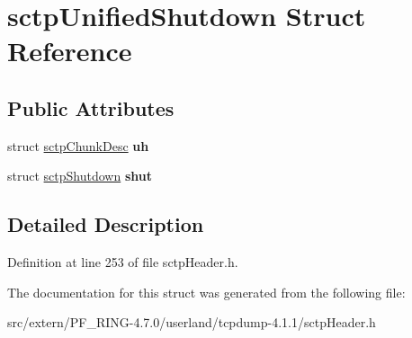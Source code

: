 \hypertarget{structsctp_unified_shutdown}{
\section{sctpUnifiedShutdown Struct Reference}
\label{structsctp_unified_shutdown}
}
\subsection*{Public Attributes}
\begin{DoxyCompactItemize}
\item 
\hypertarget{structsctp_unified_shutdown_a99b7668a0f0a5b8d8cde5ee662668435}{
struct \hyperlink{structsctp_chunk_desc}{sctpChunkDesc} {\bfseries uh}}
\label{structsctp_unified_shutdown_a99b7668a0f0a5b8d8cde5ee662668435}

\item 
\hypertarget{structsctp_unified_shutdown_a76419d944b06e6db6559a7b240d8636c}{
struct \hyperlink{structsctp_shutdown}{sctpShutdown} {\bfseries shut}}
\label{structsctp_unified_shutdown_a76419d944b06e6db6559a7b240d8636c}

\end{DoxyCompactItemize}


\subsection{Detailed Description}


Definition at line 253 of file sctpHeader.h.



The documentation for this struct was generated from the following file:\begin{DoxyCompactItemize}
\item 
src/extern/PF\_\-RING-\/4.7.0/userland/tcpdump-\/4.1.1/sctpHeader.h\end{DoxyCompactItemize}
